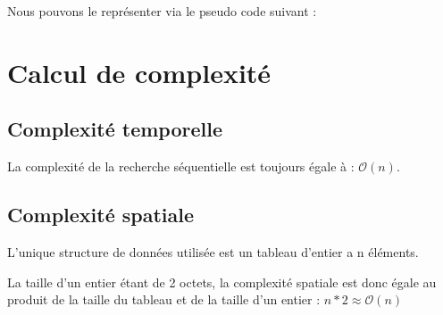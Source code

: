 \par
Nous pouvons le représenter via le pseudo code suivant :


\section{Calcul de complexité}
\subsection{Complexité temporelle}
La complexité de la recherche séquentielle est toujours égale à : $\mathcal{O}(n)$.

\subsection{Complexité spatiale}
\par
L'unique structure de données utilisée est un tableau d'entier a n éléments. 
\par
La taille d'un entier étant de 2 octets, la complexité spatiale est donc égale au produit de la taille du tableau et de la taille d'un entier : $n * 2 \approx \mathcal{O}(n)$
\par

